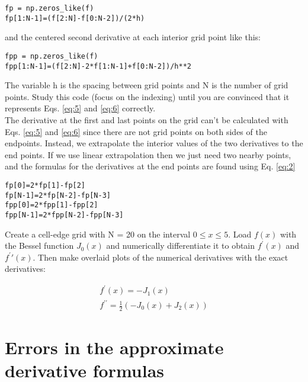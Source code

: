 \begin{lstlisting}
fp = np.zeros_like(f)
fp[1:N-1]=(f[2:N]-f[0:N-2])/(2*h)
\end{lstlisting}
and the centered second derivative at each interior grid point like this:
\begin{lstlisting}
fpp = np.zeros_like(f) 
fpp[1:N-1]=(f[2:N]-2*f[1:N-1]+f[0:N-2])/h**2
\end{lstlisting}

The variable h is the spacing between grid points and N is the number of grid points. Study this code (focus on the indexing) until you are convinced that it represents Eqs. \ref{eq:5} and \ref{eq:6} correctly. \\The derivative at the first and last points on the grid can\rq t be calculated with Eqs.  \ref{eq:5} and \ref{eq:6} since there are not grid points on both sides of the endpoints. Instead, we extrapolate the interior values of the two derivatives to the end points. If we use linear extrapolation then we just need two nearby points, and the formulas for the derivatives at the end points are found using Eq. \ref{eq:2}
\begin{lstlisting}
fp[0]=2*fp[1]-fp[2] 
fp[N-1]=2*fp[N-2]-fp[N-3] 
fpp[0]=2*fpp[1]-fpp[2] 
fpp[N-1]=2*fpp[N-2]-fpp[N-3]
\end{lstlisting}

\begin{problem} \label{P1.4}
Create a cell-edge grid with N = 20 on the interval $0 \leq x \leq 5$. Load $f(x)$ with the Bessel function $J_0(x)$ and numerically differentiate it to obtain $f^\prime(x)$ and $f^\prime\prime(x)$. Then make overlaid plots of the numerical derivatives with the exact derivatives:
\end{problem}

\begin{equation*}
\begin{split}
			f^\prime(x) = -J_1(x)\\
			f^{\prime\prime} = \frac{1}{2}(-J_0(x)+J_2(x))	
			\end{split}
\end{equation*}

\section*{Errors in the approximate derivative formulas}

